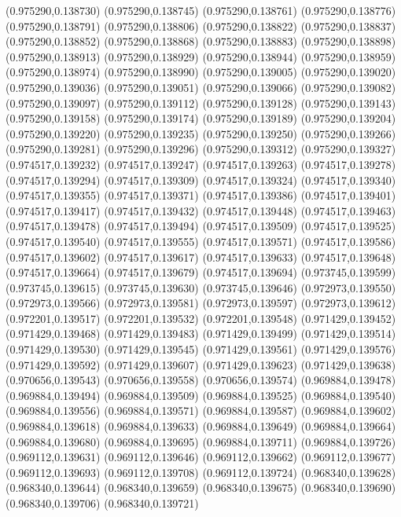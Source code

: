 (0.975290,0.138730)
(0.975290,0.138745)
(0.975290,0.138761)
(0.975290,0.138776)
(0.975290,0.138791)
(0.975290,0.138806)
(0.975290,0.138822)
(0.975290,0.138837)
(0.975290,0.138852)
(0.975290,0.138868)
(0.975290,0.138883)
(0.975290,0.138898)
(0.975290,0.138913)
(0.975290,0.138929)
(0.975290,0.138944)
(0.975290,0.138959)
(0.975290,0.138974)
(0.975290,0.138990)
(0.975290,0.139005)
(0.975290,0.139020)
(0.975290,0.139036)
(0.975290,0.139051)
(0.975290,0.139066)
(0.975290,0.139082)
(0.975290,0.139097)
(0.975290,0.139112)
(0.975290,0.139128)
(0.975290,0.139143)
(0.975290,0.139158)
(0.975290,0.139174)
(0.975290,0.139189)
(0.975290,0.139204)
(0.975290,0.139220)
(0.975290,0.139235)
(0.975290,0.139250)
(0.975290,0.139266)
(0.975290,0.139281)
(0.975290,0.139296)
(0.975290,0.139312)
(0.975290,0.139327)
(0.974517,0.139232)
(0.974517,0.139247)
(0.974517,0.139263)
(0.974517,0.139278)
(0.974517,0.139294)
(0.974517,0.139309)
(0.974517,0.139324)
(0.974517,0.139340)
(0.974517,0.139355)
(0.974517,0.139371)
(0.974517,0.139386)
(0.974517,0.139401)
(0.974517,0.139417)
(0.974517,0.139432)
(0.974517,0.139448)
(0.974517,0.139463)
(0.974517,0.139478)
(0.974517,0.139494)
(0.974517,0.139509)
(0.974517,0.139525)
(0.974517,0.139540)
(0.974517,0.139555)
(0.974517,0.139571)
(0.974517,0.139586)
(0.974517,0.139602)
(0.974517,0.139617)
(0.974517,0.139633)
(0.974517,0.139648)
(0.974517,0.139664)
(0.974517,0.139679)
(0.974517,0.139694)
(0.973745,0.139599)
(0.973745,0.139615)
(0.973745,0.139630)
(0.973745,0.139646)
(0.972973,0.139550)
(0.972973,0.139566)
(0.972973,0.139581)
(0.972973,0.139597)
(0.972973,0.139612)
(0.972201,0.139517)
(0.972201,0.139532)
(0.972201,0.139548)
(0.971429,0.139452)
(0.971429,0.139468)
(0.971429,0.139483)
(0.971429,0.139499)
(0.971429,0.139514)
(0.971429,0.139530)
(0.971429,0.139545)
(0.971429,0.139561)
(0.971429,0.139576)
(0.971429,0.139592)
(0.971429,0.139607)
(0.971429,0.139623)
(0.971429,0.139638)
(0.970656,0.139543)
(0.970656,0.139558)
(0.970656,0.139574)
(0.969884,0.139478)
(0.969884,0.139494)
(0.969884,0.139509)
(0.969884,0.139525)
(0.969884,0.139540)
(0.969884,0.139556)
(0.969884,0.139571)
(0.969884,0.139587)
(0.969884,0.139602)
(0.969884,0.139618)
(0.969884,0.139633)
(0.969884,0.139649)
(0.969884,0.139664)
(0.969884,0.139680)
(0.969884,0.139695)
(0.969884,0.139711)
(0.969884,0.139726)
(0.969112,0.139631)
(0.969112,0.139646)
(0.969112,0.139662)
(0.969112,0.139677)
(0.969112,0.139693)
(0.969112,0.139708)
(0.969112,0.139724)
(0.968340,0.139628)
(0.968340,0.139644)
(0.968340,0.139659)
(0.968340,0.139675)
(0.968340,0.139690)
(0.968340,0.139706)
(0.968340,0.139721)
